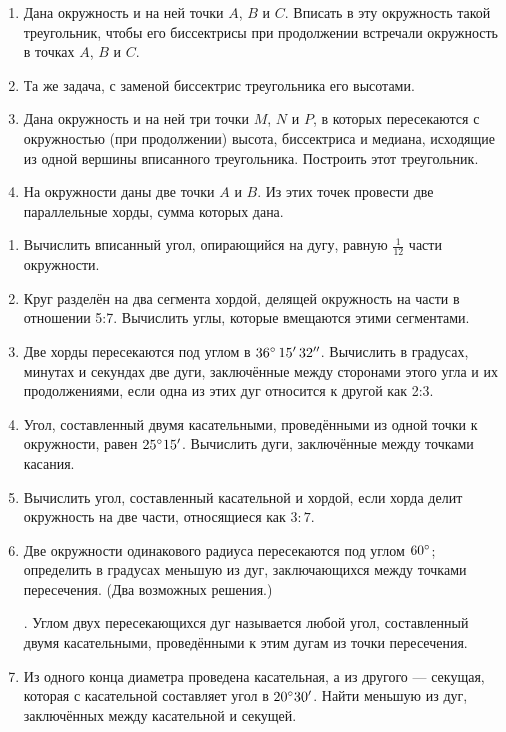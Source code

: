 \documentclass[twoside]{book}
\begin{document}
\begin{enumerate}[resume]
 \item
Дана окружность и на ней точки $A$, $B$ и $C$.
Вписать в эту окружность такой треугольник, чтобы его биссектрисы при продолжении встречали окружность в точках $A$, $B$ и $C$.

 \item
Та же задача, с заменой биссектрис треугольника его высотами.

 \item
Дана окружность и на ней три точки $M$, $N$ и $P$, в которых пересекаются с окружностью (при продолжении) высота, биссектриса и медиана, исходящие из одной вершины вписанного треугольника.
Построить этот треугольник.

 \item
На окружности даны две точки $A$ и $B$.
Из этих точек провести две параллельные хорды, сумма которых дана.

\end{enumerate}

\begin{center}
\end{center}

\begin{enumerate}[resume]

 \item
Вычислить вписанный угол, опирающийся на дугу, равную $\tfrac1{12}$ части окружности.

 \item
Круг разделён на два сегмента хордой, делящей окружность на части в отношении 5:7.
Вычислить углы, которые вмещаются этими сегментами.

 \item
Две хорды пересекаются под углом в $36\degree\, 15'\, 32''$.
Вычислить в градусах, минутах и секундах две дуги, заключённые между сторонами этого угла и их продолжениями, если одна из этих дуг относится к другой как 2:3.

 \item
Угол, составленный двумя касательными, проведёнными из одной точки к окружности, равен $25\degree15'$.
Вычислить дуги, заключённые между точками касания.

 \item
Вычислить угол, составленный касательной и хордой, если хорда делит окружность на две части, относящиеся как $3:7$.

 \item
Две окружности одинакового радиуса пересекаются под углом $60\degree$;
определить в градусах меньшую из дуг, заключающихся между точками пересечения. (Два возможных решения.)

\smallskip
{}.
Углом двух пересекающихся дуг называется любой угол, составленный двумя касательными, проведёнными к этим дугам из точки пересечения.

 \item
Из одного конца диаметра проведена касательная, а из другого — секущая, которая с касательной составляет угол в $20\degree 30'$.
Найти меньшую из дуг, заключённых между касательной и секущей.

\end{enumerate}
\end{document}
